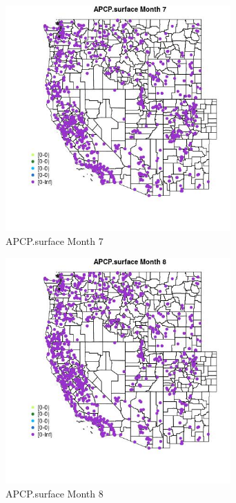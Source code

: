 \begin{figure} 
\centering  
\includegraphics[width=0.77\textwidth]{Code_Outputs/Report_ML_input_PM25_Step4_part_f_de_duplicated_aves_prioritize_24hr_obswNAs_MapObsMo7APCPsurface.jpg} 
\caption{\label{fig:Report_ML_input_PM25_Step4_part_f_de_duplicated_aves_prioritize_24hr_obswNAsMapObsMo7APCPsurface}APCP.surface Month 7} 
\end{figure} 
 

\begin{figure} 
\centering  
\includegraphics[width=0.77\textwidth]{Code_Outputs/Report_ML_input_PM25_Step4_part_f_de_duplicated_aves_prioritize_24hr_obswNAs_MapObsMo8APCPsurface.jpg} 
\caption{\label{fig:Report_ML_input_PM25_Step4_part_f_de_duplicated_aves_prioritize_24hr_obswNAsMapObsMo8APCPsurface}APCP.surface Month 8} 
\end{figure} 
 

